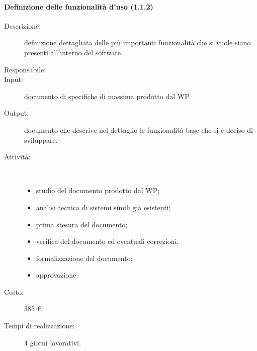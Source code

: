 \paragraph{Definizione delle funzionalit\`{a} d'uso (1.1.2)}
\begin{description}
\item[Descrizione:] definizione dettagliata delle pi\`{u} importanti funzionalit\`{a} che si vuole siano presenti all'interno del software.
\item[Responsabile:]
\item[Input:] documento di specifiche di massima prodotto dal WP.
\item[Output:] documento che descrive nel dettaglio le funzionalità base che si è deciso di sviluppare.
\item[Attività:]\mbox{}\\[-1.5\baselineskip]
	\begin{itemize}
	\item studio del documento prodotto dal WP;
	\item analisi tecnica di sistemi simili gi\`{a} esistenti;
	\item prima stesura del documento;
	\item verifica del documento ed eventuali correzioni;
	\item formalizzazione del documento;
	\item approvazione.
	\end{itemize}
\item[Costo:] 385 \euro{}
\item[Tempi di realizzazione:] 4 giorni lavorativi.
\end{description}

